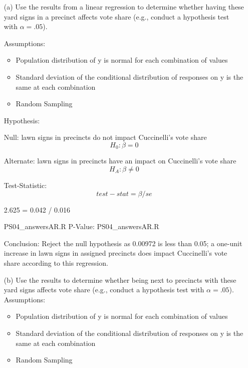 \documentclass[12pt,letterpaper]{article}
\begin{document}
\begin{enumerate}
	\item [(a)] Use the results from a linear regression to determine whether having these yard signs in a precinct affects vote share (e.g., conduct a hypothesis test with $\alpha = .05$).
	
Assumptions:
\begin{itemize}
\item Population distribution of y is normal for each combination of values

\item Standard deviation of the conditional distribution of responses on y is the same at each combination

\item Random Sampling
\end{itemize}

Hypothesis:
\begin{center}
	Null: lawn signs in  precincts do not impact Cuccinelli's vote share $$H_0: \beta = 0$$

Alternate: lawn signs in precincts have an impact on Cuccinelli's vote share $$H_A: \beta \neq 0$$
\end{center}

Test-Statistic:
	$$test-stat = \beta / se$$
	 \begin{center}
2.625  = 0.042 / 0.016
	 \end{center}
	  {PS04_answersAR.R}
	P-Value:
	 {PS04_answersAR.R}
	
	Conclusion:
	Reject the null hypothesis as 0.00972 is less than 0.05; a one-unit increase in lawn signs in assigned precincts does impact Cuccinelli's vote share according to this regression.
	\newpage		
	\item [(b)]  Use the results to determine whether being
	next to precincts with these yard signs affects vote
	share (e.g., conduct a hypothesis test with $\alpha = .05$).
Assumptions:
\begin{itemize}
	\item Population distribution of y is normal for each combination of values
	
	\item Standard deviation of the conditional distribution of responses on y is the same at each combination
	
	\item Random Sampling
\end{itemize}


\end{enumerate}
\end{document}

